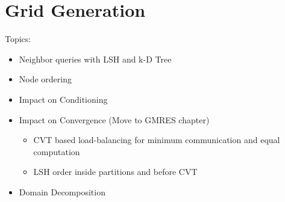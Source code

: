 \chapter{Grid Generation}

Topics: 
\begin{itemize} 
    \item Neighbor queries with LSH and k-D Tree
    \item Node ordering
    \item Impact on Conditioning
    \item Impact on Convergence (Move to GMRES chapter)
    \begin{itemize} 
        \item CVT based load-balancing for minimum communication and equal computation
        \item LSH order inside partitions and before CVT 
    \end{itemize}
    \item Domain Decomposition
\end{itemize} 
